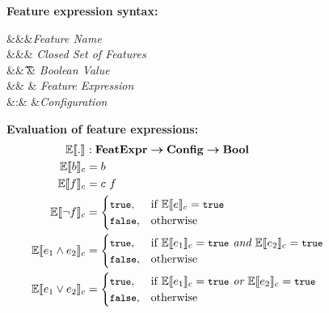 \begin{figure}
%
\textbf{Feature expression syntax:}
\begin{syntax}
\synDef \fName \fSet &&&\textit{Feature Name}\\
\synDef \features {\settype \fSet} &&& \textit{Closed Set of Features}\\
\synDef \bTag \bSet &\eqq& \t \myOR \f & \textit{Boolean Value}\\
\synDef \dimMeta \ffSet &\eqq& \bTag \myOR \fName \myOR \neg \dimMeta \myOR \dimMeta \wedge \dimMeta \myOR \dimMeta \vee \dimMeta & \textit{Feature Expression}\\
\synDef \config \confSet &:& \fSet \totype \bSet &\textit{Configuration}
\end{syntax}

\medskip
\textbf{Evaluation of feature expressions:}
\begin{alignat*}{1}
\fSem [] . &: \ffSet \totype \confSet \totype \bSet\\
\fSem \bTag &= \bTag\\
\fSem \fName &= \config \ \fName\\
\fSem {\neg \fName} &= 
	\begin{cases}
	  \t, &\If \fSem \dimMeta = \t\\
	  \f, &\Otherwise
	\end{cases}\\
\fSem {\annd \dimMeta} &= 
	\begin{cases}
	  \t, &\If \fSem {\dimMeta_1} = \t \textit{ and } \fSem {\dimMeta_2} = \t\\
	  \f, &\Otherwise
	\end{cases}\\
\fSem {\orr \dimMeta} &= 
	\begin{cases}
	  \t, &\If \fSem {\dimMeta_1} = \t \textit{ or } \fSem {\dimMeta_2} = \t\\
	  \f, &\Otherwise
	\end{cases}
\end{alignat*}


\end{figure}
